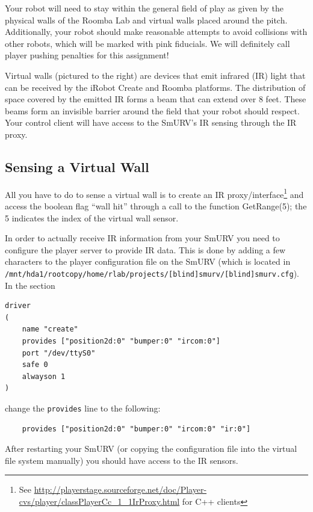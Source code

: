 Your robot will need to stay within the general field of play as given by the physical walls of the Roomba Lab and virtual walls placed around the pitch.  Additionally, your robot should make reasonable attempts to avoid collisions with other robots, which will be marked with pink fiducials.  We will definitely call player pushing penalties for this assignment!

Virtual walls (pictured to the right) are devices that emit infrared (IR) light that can be received by the iRobot Create and Roomba platforms.  The distribution of space covered by the emitted IR forms a beam that can extend over 8 feet.  These beams form an invisible barrier around the field that your robot should respect.  Your control client will have access to the SmURV's IR sensing through the IR proxy.

\subsection{Sensing a Virtual Wall}
All you have to do to sense a virtual wall is to create an IR proxy/interface\footnote{See \url{http://playerstage.sourceforge.net/doc/Player-cvs/player/classPlayerCc_1_1IrProxy.html} for C++ clients} and access the boolean flag ``wall hit'' through a call to the function GetRange(5); the 5 indicates the index of the virtual wall sensor.

In order to actually receive IR information from your SmURV you need to configure the player server to provide IR data. This is done by adding a few characters to the player configuration file on the SmURV (which is located in \texttt{/mnt/hda1/rootcopy/home/rlab/projects/[blind]smurv/[blind]smurv.cfg}). In the section
\begin{verbatim}
driver
(
    name "create"
    provides ["position2d:0" "bumper:0" "ircom:0"]
    port "/dev/ttyS0"
    safe 0
    alwayson 1
)
\end{verbatim}
change the \texttt{provides} line to the following:
\begin{verbatim}
    provides ["position2d:0" "bumper:0" "ircom:0" "ir:0"]
\end{verbatim}
After restarting your SmURV (or copying the configuration file into the virtual file system manually) you should have access to the IR sensors.

